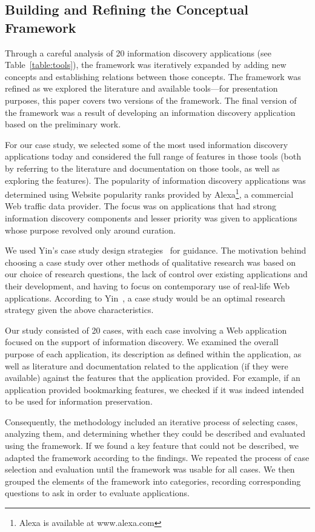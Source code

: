 \documentclass{sigchi}
\begin{document}
{\subsection{Building and Refining the Conceptual Framework}
\label{subsection:building}
Through a careful analysis of 20 information discovery applications (see Table~\ref{table:tools}), the framework was iteratively expanded by adding new concepts and establishing relations between those concepts.  The framework was refined as we explored the literature and available tools---for presentation purposes, this paper covers two versions of the framework. The final version of the framework was a result of developing an information discovery application based on the preliminary work.    

For our case study, we selected some of the most used information discovery applications today and considered the full range of features in those tools (both by referring to the literature and documentation on those tools, as well as exploring the features). The popularity of information discovery applications was determined using Website popularity ranks provided by Alexa\footnote[1]{Alexa is available at www.alexa.com}, a commercial Web traffic data provider. The focus was on applications that had strong information discovery components and lesser priority was given to applications whose purpose revolved only around curation.

We used Yin's case study design strategies~\cite{yin2014case} for guidance. The motivation behind choosing a case study over other methods of qualitative research was based on our choice of research questions, the lack of control over existing applications and their development, and having to focus on contemporary use of real-life Web applications. According to Yin~\cite{yin2014case}, a case study would be an optimal research strategy given the above characteristics.

Our study consisted of 20 cases, with each case involving a Web application focused on the support of information discovery. We examined the overall purpose of each application, its description as defined within the application, as well as literature and documentation related to the application (if they were available) against the features that the application provided. For example, if an application provided bookmarking features, we checked if it was indeed intended to be used for information preservation. 

Consequently, the methodology included an iterative process of selecting cases, analyzing them, and determining whether they could be described and evaluated using the framework. If we found a key feature that could not be described, we adapted the framework according to the findings. We repeated the process of case selection and evaluation until the framework was usable for all cases. We then grouped the elements of the framework into categories, recording corresponding questions to ask in order to evaluate applications. 

}
\end{document}
